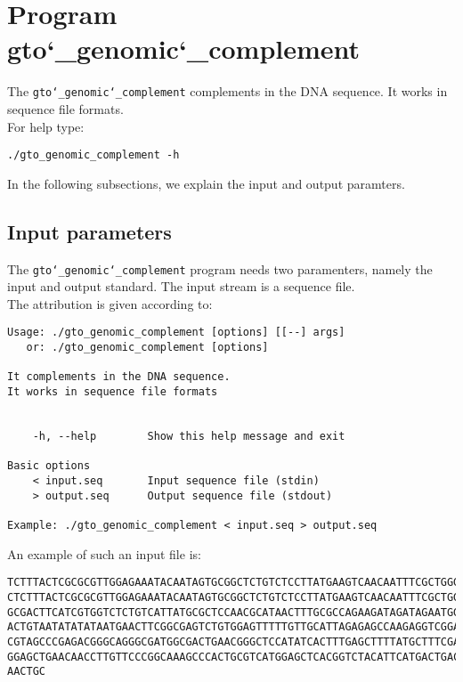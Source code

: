 \section{Program gto\char`_genomic\char`_complement}
The \texttt{gto\char`_genomic\char`_complement} complements in the DNA sequence. It works in sequence file formats.\\
For help type:
\begin{lstlisting}
./gto_genomic_complement -h
\end{lstlisting}
In the following subsections, we explain the input and output paramters.

\subsection*{Input parameters}

The \texttt{gto\char`_genomic\char`_complement}  program needs two paramenters, namely the input and output standard. The input stream is a sequence file.\\
The attribution is given according to:
\begin{lstlisting}
Usage: ./gto_genomic_complement [options] [[--] args]
   or: ./gto_genomic_complement [options]

It complements in the DNA sequence.
It works in sequence file formats


    -h, --help        Show this help message and exit

Basic options
    < input.seq       Input sequence file (stdin)
    > output.seq      Output sequence file (stdout)

Example: ./gto_genomic_complement < input.seq > output.seq
\end{lstlisting}
An example of such an input file is:
\begin{lstlisting}
TCTTTACTCGCGCGTTGGAGAAATACAATAGTGCGGCTCTGTCTCCTTATGAAGTCAACAATTTCGCTGGGACTTGCGG
CTCTTTACTCGCGCGTTGGAGAAATACAATAGTGCGGCTCTGTCTCCTTATGAAGTCAACAATTTCGCTGGGACTTGCG
GCGACTTCATCGTGGTCTCTGTCATTATGCGCTCCAACGCATAACTTTGCGCCAGAAGATAGATAGAATGGTGTAAGAA
ACTGTAATATATATAATGAACTTCGGCGAGTCTGTGGAGTTTTTGTTGCATTAGAGAGCCAAGAGGTCGGACGTCCTCA
CGTAGCCCGAGACGGGCAGGGCGATGGCGACTGAACGGGCTCCATATCACTTTGAGCTTTTATGCTTTCGACTCCTCCA
GGAGCTGAACAACCTTGTTCCCGGCAAAGCCCACTGCGTCATGGAGCTCACGGTCTACATTCATGACTGACTAACCGTA
AACTGC
\end{lstlisting}

